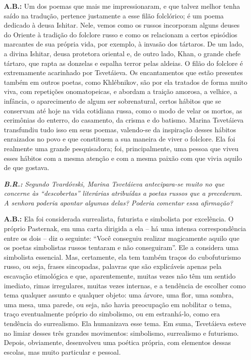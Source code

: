\textbf{A.B.:} Um dos poemas que mais me impressionaram, e que talvez
melhor tenha saído na tradução, pertence justamente a esse filão
folclórico; é um poema dedicado à deusa Ishitar. Nele, vemos como os
russos incorporam alguns deuses do Oriente à tradição do folclore russo
e como os relacionam a certos episódios marcantes de sua própria vida,
por exemplo, à invasão dos tártaros. De um lado, a divina Ishitar, deusa
protetora oriental e, de outro lado, Khan, o grande chefe tártaro, que
rapta as donzelas e espalha terror pelas aldeias. O filão do folclore é
extremamente acarinhado por Tsvetáieva. Os encantamentos que estão
presentes também em outros poetas, como Khlébnikov, são por ela tratados
de forma muito viva, com repetições onomatopeicas, e abordam a traição
amorosa, a velhice, a infância, o aparecimento de algum ser
sobrenatural, certos hábitos que se conservam até hoje na vida cotidiana
russa, como o modo de velar os mortos, as cerimônias do enterro, do
casamento, da crisma e do batismo. Marina Tsvetáieva transfundiu tudo
isso em seus poemas, valendo-se da inspiração desses hábitos enraizados
no povo e que constituem a sua maneira de viver o folclore. Ela foi
realmente uma grande pesquisadora; foi, principalmente, uma pessoa que
viveu esses hábitos com a mesma atenção e com a mesma paixão com que
vivia aquilo de que gostava.

\emph{\textbf{B.R.:} Segundo Tvardóvski, Marina Tsvetáieva antecipara-se
muito no que concerne às ``descobertas'' literárias atribuídas a poetas
russos que a precederam. A senhora poderia apontar algumas delas?
Poderia comentar essa afirmação?}

\textbf{A.B.:} Ela foi considerada surrealista, futurista e simbolista
por excelência. O próprio Pasternak, em uma carta dirigida a ela -- há
uma intensa correspondência entre os dois -- diz o seguinte: ``Você
conseguiu realizar magicamente aquilo que os poetas simbolistas russos
tentaram e não conseguiram''. Ele a considera uma simbolista essencial.
Mas, certamente, ela tem também traços do cubofuturismo russo, ou seja,
frases sincopadas, palavras que são explicáveis apenas pela escavação
etimológica e que, aparentemente, muitas vezes não têm um sentido
imediato, rimas irregulares, muitas vezes internas, e a tendência de
escolher como tema qualquer assunto e qualquer objeto: uma árvore, uma
flor, uma sombra, uma mesa, uma parede, ou seja, não havia preocupação
em nobilitar o tema, traço eventualmente próprio do simbolismo, ou em
estranhá-lo, como era tendência do surrealismo. Ela humanizava esse
tema. Em suma, Tsvetáieva esteve no limiar desses três grandes
movimentos: simbolismo, surrealismo e futurismo. Depois, obviamente,
desenvolveu uma poética própria, com elementos dessas escolas, mas muito
particular e pessoal.

